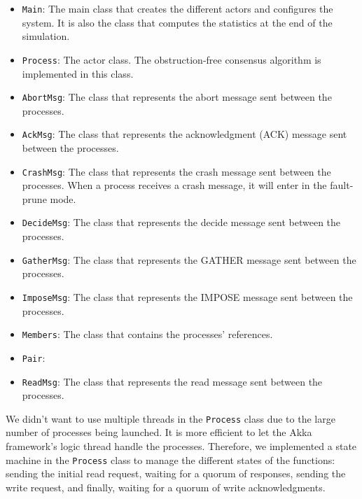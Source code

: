 \documentclass{article}
\begin{document}
\begin{itemize}
    \item \texttt{Main}: The main class that creates the different actors and configures the system. It is also the class that computes the statistics at the end of the simulation.

    \item \texttt{Process}: The actor class. The obstruction-free consensus algorithm is implemented in this class.

    \item \texttt{AbortMsg}: The class that represents the abort message sent between the processes.

    \item \texttt{AckMsg}: The class that represents the acknowledgment (ACK) message sent between the processes.

    \item \texttt{CrashMsg}: The class that represents the crash message sent between the processes. When a process receives a crash message, it will enter in the fault-prune mode.

    \item \texttt{DecideMsg}: The class that represents the decide message sent between the processes.

    \item \texttt{GatherMsg}: The class that represents the GATHER message sent between the processes.

    \item \texttt{ImposeMsg}: The class that represents the IMPOSE message sent between the processes.

    \item \texttt{Members}: The class that contains the processes' references.

    \item \texttt{Pair}:

    \item \texttt{ReadMsg}: The class that represents the read message sent between the processes.
\end{itemize}

We didn't want to use multiple threads in the \texttt{Process} class due to the large number of processes
being launched. It is more efficient to let the Akka framework's logic thread handle the processes.
Therefore, we implemented a state machine in the \texttt{Process} class to manage the different states
of the functions: sending the initial read request, waiting for a quorum of responses, sending the
write request, and finally, waiting for a quorum of write acknowledgments.
\end{document}
